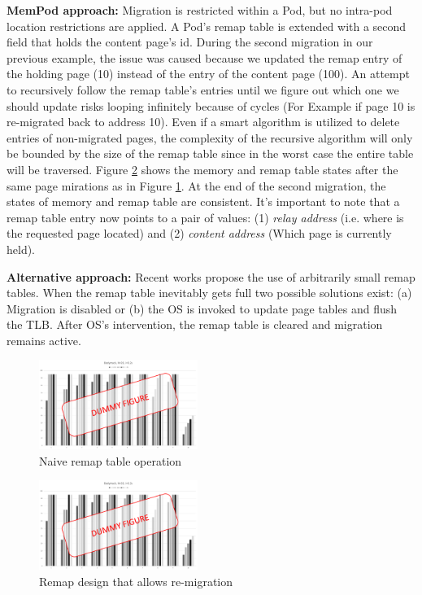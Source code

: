 	\textbf{MemPod approach:} Migration is restricted within a Pod, but no intra-pod location restrictions are applied. A Pod's remap table is extended with a second field that holds the content page's id. During the second migration in our previous example, the issue was caused because we updated the remap entry of the holding page (10) instead of the entry of the content page (100). An attempt to recursively follow the remap table's entries until we figure out which one we should update risks looping infinitely because of cycles (For Example if page 10 is re-migrated back to address 10). Even if a smart algorithm is utilized to delete entries of non-migrated pages, the complexity of the recursive algorithm will only be bounded by the size of the remap table since in the worst case the entire table will be traversed. Figure \ref{fig:correct_remap} shows the memory and remap table states after the same page mirations as in Figure \ref{fig:failed_remap}. At the end of the second migration, the states of memory and remap table are consistent. It's important to note that a remap table entry now points to a pair of values: (1) \textit{relay address} (i.e. where is the requested page located) and (2) \textit{content address} (Which page is currently held).

	\textbf{Alternative approach:} Recent works propose the use of arbitrarily small remap tables. When the remap table inevitably gets full two possible solutions exist: (a) Migration is disabled or (b) the OS is invoked to update page tables and flush the TLB. After OS's intervention, the remap table is cleared and migration remains active.


\begin{figure}[h]
  \includegraphics[width=0.46\textwidth]{figures/dummy.pdf}
  \caption{Naive remap table operation}
  \label{fig:failed_remap}
\end{figure}

\begin{figure}[h]
  \includegraphics[width=0.46\textwidth]{figures/dummy.pdf}
  \caption{Remap design that allows re-migration}
  \label{fig:correct_remap}
\end{figure}



